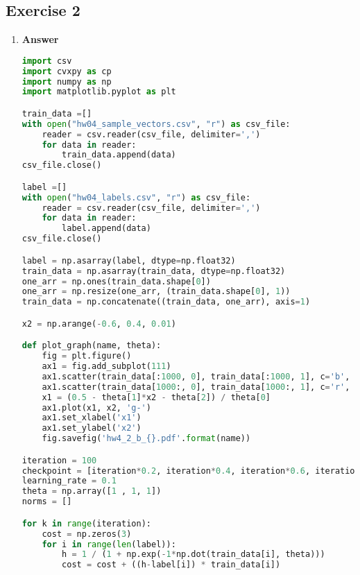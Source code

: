 \documentclass[11pt]{article}
\begin{document}
\newpage
\subsection*{Exercise 2}

\begin{enumerate}[label=(\alph*)]


\item  \textbf{Answer}

\begin{lstlisting}[language=Python, showstringspaces=false]
import csv
import cvxpy as cp
import numpy as np
import matplotlib.pyplot as plt

train_data =[]
with open("hw04_sample_vectors.csv", "r") as csv_file:
    reader = csv.reader(csv_file, delimiter=',')    
    for data in reader:
        train_data.append(data)        
csv_file.close()

label =[]
with open("hw04_labels.csv", "r") as csv_file:    
    reader = csv.reader(csv_file, delimiter=',')    
    for data in reader:
        label.append(data)        
csv_file.close()

label = np.asarray(label, dtype=np.float32)
train_data = np.asarray(train_data, dtype=np.float32)
one_arr = np.ones(train_data.shape[0])
one_arr = np.resize(one_arr, (train_data.shape[0], 1))
train_data = np.concatenate((train_data, one_arr), axis=1)

x2 = np.arange(-0.6, 0.4, 0.01)

def plot_graph(name, theta):
    fig = plt.figure()
    ax1 = fig.add_subplot(111)
    ax1.scatter(train_data[:1000, 0], train_data[:1000, 1], c='b', s=3)
    ax1.scatter(train_data[1000:, 0], train_data[1000:, 1], c='r', s=3)
    x1 = (0.5 - theta[1]*x2 - theta[2]) / theta[0]
    ax1.plot(x1, x2, 'g-')
    ax1.set_xlabel('x1')
    ax1.set_ylabel('x2')
    fig.savefig('hw4_2_b_{}.pdf'.format(name))

iteration = 100
checkpoint = [iteration*0.2, iteration*0.4, iteration*0.6, iteration*0.8]
learning_rate = 0.1
theta = np.array([1 , 1, 1])
norms = []

for k in range(iteration):
    cost = np.zeros(3)
    for i in range(len(label)):
        h = 1 / (1 + np.exp(-1*np.dot(train_data[i], theta)))
        cost = cost + ((h-label[i]) * train_data[i])
    

\end{lstlisting}
\end{enumerate}
\end{document}
